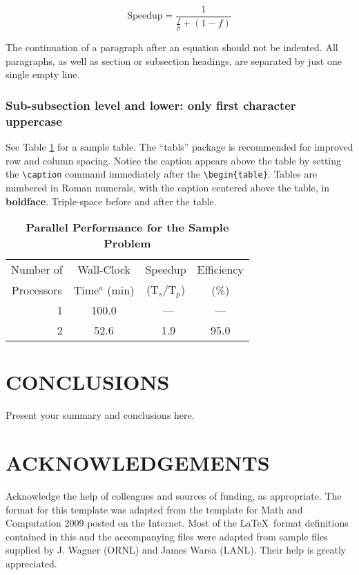 \documentclass{physor2012}
\begin{document}
\begin{equation}
  \label{sample_equation}
  \mathrm{Speedup}=\frac{1}{\frac{f}{p}+(1-f)}
\end{equation}

The continuation of a paragraph after an equation should not be indented.  
All paragraphs, as well as section or subsection headings, are separated by 
just one single empty line.
%
\subsubsection{Sub-subsection level and lower: only first character uppercase}
%
See Table \ref{table:example} for a sample table.  The ``tabls'' package is
recommended for improved row and column spacing.  Notice the caption appears 
above the table by setting the \verb!\caption! command immediately 
after the \verb!\begin{table}!. Tables are numbered in Roman 
numerals, with the caption centered above the table, in \textbf{boldface}.  
Triple-space before and after the table.
%
\begin{table}[!htb]
  \centering
  \caption{\bf Parallel Performance for the Sample Problem}
  \label{table:example} 
  \begin{tabular}{||r||c|c|c||} \hline \hline
    \multicolumn{1}{||c||}{Number of} &
    \multicolumn{1}{c|}{Wall-Clock} &
    \multicolumn{1}{c|}{Speedup} &
    \multicolumn{1}{c||}{Efficiency} \\
    \multicolumn{1}{||c||}{Processors} &
    \multicolumn{1}{c|}{Time$^{a}$ (min)} &
    \multicolumn{1}{c|}{(T$_{s}$/T$_{p}$)} &
    \multicolumn{1}{c||}{(\%)} \\ \hline\hline
    \ 1 &  100.0 & \ ---    & ---  \\ \hline
    \ 2 &   52.6 & \ 1.9    & 95.0 \\ \hline \hline
  \end{tabular}
\end{table}
%
\section{CONCLUSIONS}
%
Present your summary and conclusions here.
%
\section*{ACKNOWLEDGEMENTS}
%
Acknowledge the help of colleagues and sources of funding, as appropriate.
%
The format for this template was adapted from the template for Math and Computation 2009 
posted on the Internet.  Most of the \LaTeX\ format definitions contained
in this and the accompanying files were adapted from sample files supplied 
by J. Wagner (ORNL) and James Warsa (LANL). Their help is greatly appreciated.

%
\setlength{\baselineskip}{12pt}


\end{document}
